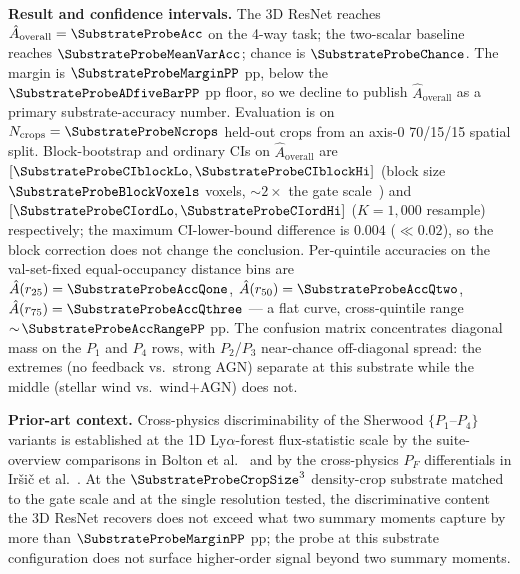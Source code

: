 \textbf{Result and confidence intervals.} The 3D ResNet reaches $\hat A_{\text{overall}} = \SubstrateProbeAcc$ on the 4-way task; the two-scalar baseline reaches $\SubstrateProbeMeanVarAcc$; chance is $\SubstrateProbeChance$. The margin is $\SubstrateProbeMarginPP$ pp, below the $\SubstrateProbeADfiveBarPP$ pp floor, so we decline to publish $\hat A_{\text{overall}}$ as a primary substrate-accuracy number. Evaluation is on $N_{\text{crops}} = \SubstrateProbeNcrops$ held-out crops from an axis-0 70/15/15 spatial split. Block-bootstrap and ordinary CIs on $\hat A_{\text{overall}}$ are $[\SubstrateProbeCIblockLo, \SubstrateProbeCIblockHi]$ (block size $\SubstrateProbeBlockVoxels$ voxels, $\sim\!2\times$ the gate scale~\cite{politis_romano1994}) and $[\SubstrateProbeCIordLo, \SubstrateProbeCIordHi]$ ($K{=}1{,}000$ resample) respectively; the maximum CI-lower-bound difference is $0.004$ ($\ll 0.02$), so the block correction does not change the conclusion. Per-quintile accuracies on the val-set-fixed equal-occupancy distance bins are $\hat A(r_{25}) = \SubstrateProbeAccQone$, $\hat A(r_{50}) = \SubstrateProbeAccQtwo$, $\hat A(r_{75}) = \SubstrateProbeAccQthree$ --- a flat curve, cross-quintile range $\sim\!\SubstrateProbeAccRangePP$ pp. The confusion matrix concentrates diagonal mass on the $P_1$ and $P_4$ rows, with $P_2$/$P_3$ near-chance off-diagonal spread: the extremes (no feedback vs.\ strong AGN) separate at this substrate while the middle (stellar wind vs.\ wind$+$AGN) does not.

\textbf{Prior-art context.} Cross-physics discriminability of the Sherwood $\{P_1$--$P_4\}$ variants is established at the 1D Ly$\alpha$-forest flux-statistic scale by the suite-overview comparisons in Bolton et al.~\cite{bolton2017sherwood} and by the cross-physics $P_F$ differentials in Iršič et al.~\cite{irsic2017xq100}. At the $\SubstrateProbeCropSize^3$ density-crop substrate matched to the gate scale and at the single resolution tested, the discriminative content the 3D ResNet recovers does not exceed what two summary moments capture by more than $\SubstrateProbeMarginPP$ pp; the probe at this substrate configuration does not surface higher-order signal beyond two summary moments.

